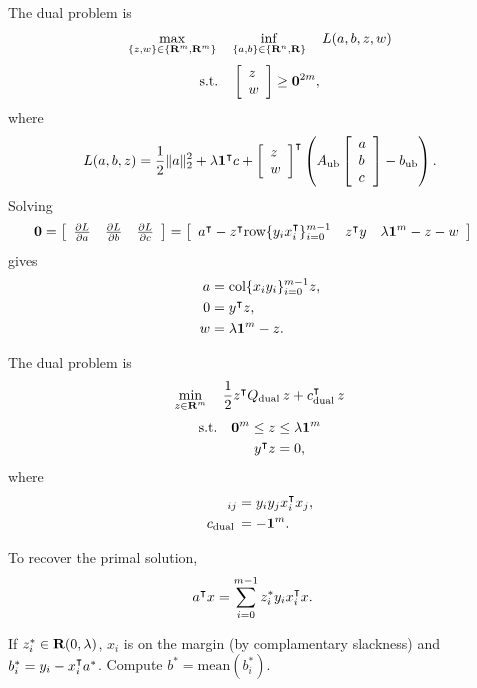 \documentclass{article}
\begin{document}
    The dual problem is 
    \begin{align*}
        \max_{\{z,w\}\in\{\textbf{R}^m,\textbf{R}^m\}}\quad \inf_{\{a,b\}\in\{\textbf{R}^n,\textbf{R}\}}\quad L(a,b,z,w)
    \end{align*}
    \begin{align*}
        \text{s.t.}\quad \left[\begin{array}{lllllllllllllllllll}z\\w\end{array}\right]\geq \textbf{0}^{2m},
    \end{align*}
    where
    \begin{align*}
        L(a,b,z) = \frac{1}{2}\|a\|_2^2+\lambda \textbf{1}^\intercal c + \left[\begin{array}{lllllllllllllllllll}z\\w\end{array}\right]^\intercal \left(A_{\text{ub}} \left[\begin{array}{lllllllllllllllllll}a\\ b\\c\end{array}\right]-b_{\text{ub}} \right).
    \end{align*}
    Solving
    \begin{align*}
        \textbf{0}=\left[\begin{array}{lllllllllllllllllll}\frac{\partial L}{\partial a} & \frac{\partial L}{\partial b} & \frac{\partial L}{\partial c}\end{array}\right]
        &=\left[\begin{array}{lllllllllllllllllll}a^\intercal-z^\intercal \text{row}\{y_ix_i^\intercal\}_{i=0}^{m-1} & z^\intercal y & \lambda\textbf{1}^m-z-w\end{array}\right]
    \end{align*}
    gives
    \begin{align*}
        a&= \text{col}\{x_iy_i\}_{i=0}^{m-1}  z,\\
        0&= y^\intercal z,\\
        w&=\lambda\textbf{1}^m-z.
    \end{align*}

    The dual problem is \cite[p.~316]{ml}
    \begin{align*}
        \min_{z\in\textbf{R}^m}\quad \frac{1}{2}z^\intercal Q_{\text{dual}\:} z+c_{\text{dual}\:}^\intercal z
    \end{align*}
    \begin{align*}
        \text{s.t.}\quad \textbf{0}^m\leq z &\leq \lambda \textbf{1}^m\\
        y^\intercal z &=0,
    \end{align*}
    where
    \begin{align*}
        [Q_{\text{dual}\:}]_{ij}
        &=y_i y_j x_i^\tp x_j, \\
        c_{\text{dual}\:}&=-\ones^m.
    \end{align*}

    To recover the primal solution,
    \begin{align*}
        a^\intercal x &= \sum_{i=0}^{m-1} z_i^* y_i x_i^\intercal x.
    \end{align*}

    If $z_i^*\in\textbf{R}(0,\lambda)$, $x_i$ is on the margin (by complamentary slackness) and $b_i^*=y_i-x_i^\intercal a^*$.
    Compute $b^*=\text{mean}(b_i^*)$.
\end{document}
